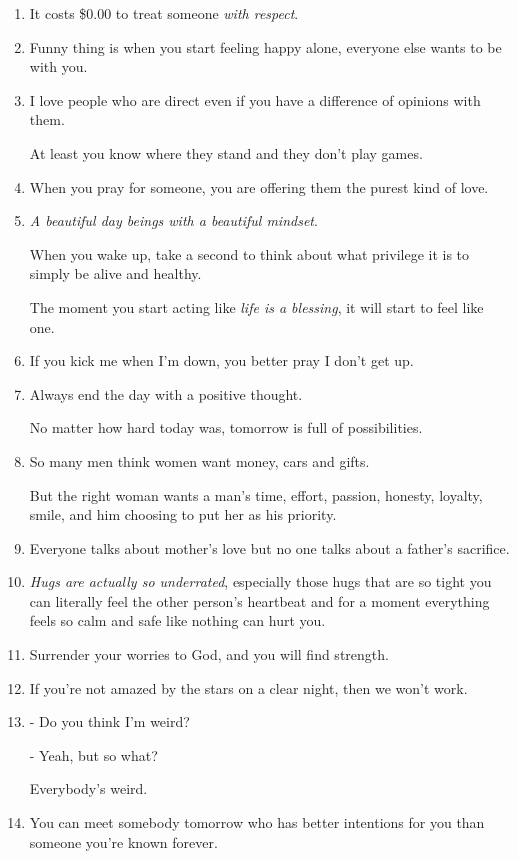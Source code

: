 \documentclass{article}
\numberwithin{equation}{section}
\begin{document}
\begin{enumerate}
    \textit{I miss your everything}$\ldots$
    \item It costs \$0.00 to treat someone \textit{with respect}.
    \item Funny thing is when you start feeling happy alone, everyone else wants to be with you.
    \item I love people who are direct even if you have a difference of opinions with them.
    
    At least you know where they stand and they don't play games.
    \item When you pray for someone, you are offering them the purest kind of love.
    \item \textit{A beautiful day beings with a beautiful mindset}.
    
    When you wake up, take a second to think about what privilege it is to simply be alive and healthy.
    
    The moment you start acting like \textit{life is a blessing}, it will start to feel like one.
    \item If you kick me when I'm down, you better pray I don't get up.
    \item Always end the day with a positive thought.
    
    No matter how hard today was, tomorrow is full of possibilities.
    \item So many men think women want money, cars and gifts.
    
    But the right woman wants a man's time, effort, passion, honesty, loyalty, smile, and him choosing to put her as his priority.
    \item Everyone talks about mother's love but no one talks about a father's sacrifice.
    \item \textit{Hugs are actually so underrated}, especially those hugs that are so tight you can literally feel the other person's heartbeat and for a moment everything feels so calm and safe like nothing can hurt you.
    \item Surrender your worries to God, and you will find strength.
    \item If you're not amazed by the stars on a clear night, then we won't work.
    \item - Do you think I'm weird?
    
    - Yeah, but so what?
    
    Everybody's weird.
    \item You can meet somebody tomorrow who has better intentions for you than someone you're known forever.
    

\end{enumerate}
\end{document}
